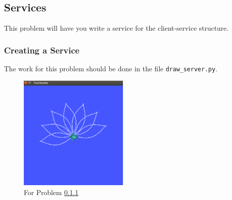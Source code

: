 \subsection{Services}

This problem will have you write a service for the client-service structure. 

\subsubsection{Creating a Service}\label{p:service1}

The work for this problem should be done in the file \texttt{draw\_server.py}.

\begin{figure}[h]
  \centering
  \includegraphics[width=150pt]{figures/p1/problem4a.png}
  \caption{For Problem \ref{p:service1}}
  \label{fig:3}
\end{figure}

